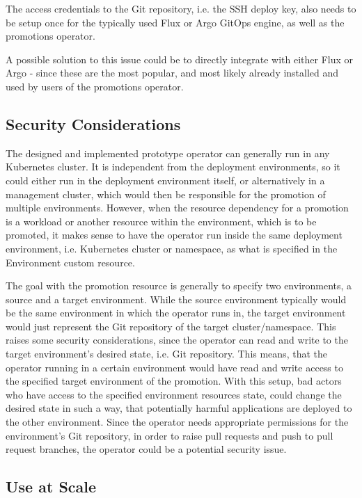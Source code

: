 The access credentials to the Git repository, i.e. the SSH deploy key,
also needs to be setup once for the typically used Flux or Argo GitOps engine,
as well as the promotions operator.

A possible solution to this issue could be to directly integrate with either Flux or Argo - since these are the most popular, and most likely already installed and used by users of the promotions operator.

\subsection*{Security Considerations}

The designed and implemented prototype operator can generally run in any Kubernetes cluster.
It is independent from the deployment environments, so it could either run in the deployment environment itself,
or alternatively in a management cluster, which would then be responsible for the promotion of multiple environments.
However, when the resource dependency for a promotion is a workload or another resource within the environment,
which is to be promoted, it makes sense to have the operator run inside the same deployment environment, i.e. Kubernetes cluster or namespace, as what is specified in the Environment custom resource.

The goal with the promotion resource is generally to specify two environments,
a source and a target environment.
While the source environment typically would be the same environment in which the operator runs in,
the target environment would just represent the Git repository of the target cluster/namespace.
This raises some security considerations,
since the operator can read and write to the target environment's desired state, i.e. Git repository.
This means, that the operator running in a certain environment would have read and write access
to the specified target environment of the promotion.
With this setup, bad actors who have access to the specified environment resources state,
could change the desired state in such a way, that
potentially harmful applications are deployed to the other environment.
Since the operator needs appropriate permissions for the environment's Git repository,
in order to raise pull requests and push to pull request branches, the operator could
be a potential security issue.

\subsection*{Use at Scale}


